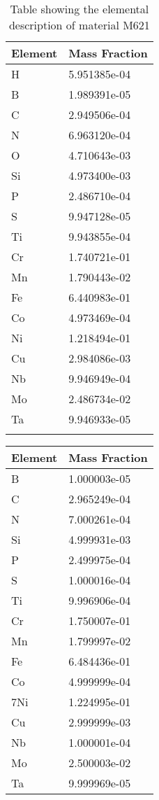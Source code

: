 \begin{centering}
\begin{longtable}[ht!]
  { p{} | p{} }
\hline
Element & Mass Fraction\\
\hline
H &  5.951385e-04\\
B &  1.989391e-05\\
C &  2.949506e-04\\
N &  6.963120e-04\\
O &  4.710643e-03\\
Si &  4.973400e-03\\
P &  2.486710e-04\\
S &  9.947128e-05\\
Ti &  9.943855e-04\\
Cr &  1.740721e-01\\
Mn &  1.790443e-02\\
Fe &  6.440983e-01\\
Co &  4.973469e-04\\
Ni &  1.218494e-01\\
Cu &  2.984086e-03\\
Nb &  9.946949e-04\\
Mo &  2.486734e-02\\
Ta &  9.946933e-05\\

\caption{Table showing the elemental description of material M621}
\label{table:material_M621}
\end{longtable}
\clearpage

\begin{longtable}[ht!]
  { p{} | p{} }
\hline
Element & Mass Fraction\\
\hline
B &  1.000003e-05\\
C &  2.965249e-04\\
N &  7.000261e-04\\
Si &  4.999931e-03\\
P &  2.499975e-04\\
S &  1.000016e-04\\
Ti &  9.996906e-04\\
Cr &  1.750007e-01\\
Mn &  1.799997e-02\\
Fe &  6.484436e-01\\
Co &  4.999999e-04\\
7Ni &  1.224995e-01\\
Cu &  2.999999e-03\\
Nb &  1.000001e-04\\
Mo &  2.500003e-02\\
Ta &  9.999969e-05\\


\end{longtable}
\end{centering}
